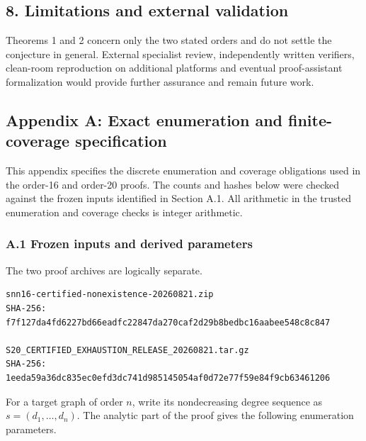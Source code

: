 \documentclass[
  english,
  11pt,
  a4paper,
]{article}
\newcounter{none} %
\begin{document}
\subsection{8. Limitations and external
validation}\label{limitations-and-external-validation}

Theorems 1 and 2 concern only the two stated orders and do not settle
the conjecture in general. External specialist review, independently
written verifiers, clean-room reproduction on additional platforms and
eventual proof-assistant formalization would provide further assurance
and remain future work.

\newpage

\subsection{Appendix A: Exact enumeration and finite-coverage
specification}\label{appendix-a-exact-enumeration-and-finite-coverage-specification}

This appendix specifies the discrete enumeration and coverage
obligations used in the order-16 and order-20 proofs. The counts and
hashes below were checked against the frozen inputs identified in
Section A.1. All arithmetic in the trusted enumeration and coverage
checks is integer arithmetic.

\subsubsection{A.1 Frozen inputs and derived
parameters}\label{a.1-frozen-inputs-and-derived-parameters}

The two proof archives are logically separate.

\begin{verbatim}
snn16-certified-nonexistence-20260821.zip
SHA-256: f7f127da4fd6227bd66eadfc22847da270caf2d29b8bedbc16aabee548c8c847

S20_CERTIFIED_EXHAUSTION_RELEASE_20260821.tar.gz
SHA-256: 1eeda59a36dc835ec0efd3dc741d985145054af0d72e77f59e84f9cb63461206
\end{verbatim}

For a target graph of order \(n\), write its nondecreasing degree
sequence as \(s=(d_1,\ldots,d_n)\). The analytic part of the proof gives
the following enumeration parameters.
\end{document}
